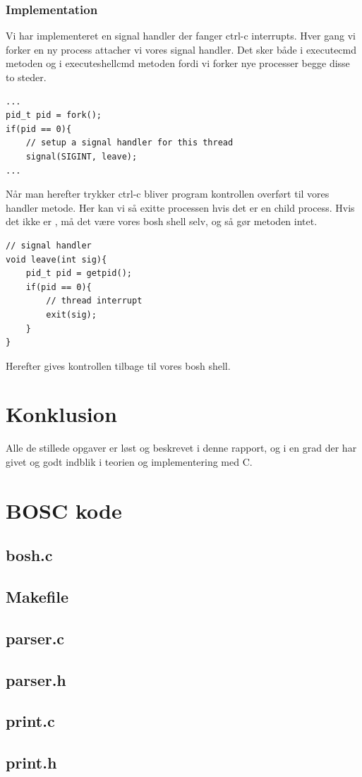\documentclass[danish]{report}
\begin{document}
\subsection{Implementation}
Vi har implementeret en signal handler der fanger ctrl-c interrupts. Hver gang vi forker en ny process attacher vi vores signal handler. Det sker både i executecmd metoden og i executeshellcmd metoden fordi vi forker nye processer begge disse to steder. 

\begin{lstlisting}
...
pid_t pid = fork();
if(pid == 0){
	// setup a signal handler for this thread
	signal(SIGINT, leave);
...
\end{lstlisting}

Når man herefter trykker ctrl-c bliver program kontrollen overført til vores handler metode. Her kan vi så exitte processen hvis det er en child process. Hvis det ikke er , må det være vores bosh shell selv, og så gør metoden intet. 

\begin{lstlisting}
// signal handler
void leave(int sig){
	pid_t pid = getpid();
	if(pid == 0){
		// thread interrupt
		exit(sig);
	}
}
\end{lstlisting}

Herefter gives kontrollen tilbage til vores bosh shell.

\chapter{Konklusion}

Alle de stillede opgaver er løst og beskrevet i denne rapport, og i en grad der har givet og godt indblik i teorien og implementering med C.

\appendix
\chapter{BOSC kode}
\section{bosh.c}


\section{Makefile}


\section{parser.c}


\section{parser.h}


\section{print.c}


\section{print.h}

\end{document}
